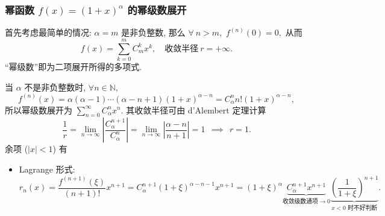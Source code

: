 \begin{frame}
\frametitle{幂函数 $f(x) = (1 + x)^{\alpha}$ 的幂级数展开}

{\color{red} } 首先考虑最简单的情况: $\alpha = m$ 是非负整数, 那么 $\forall ~ n > m,$ $f^{(n)}(0) = 0,$ 从而
\[
f(x) = \sum_{k=0}^m C_m^k x^k, \quad \text{收敛半径} ~ r = +\infty.
\]
``幂级数''即为二项展开所得的多项式.

\pause
\vspace{0.5em}

{\color{red} } 当 $\alpha$ 不是非负整数时, $\forall n \in \mathbb{N},$
\[
f^{(n)}(x) = \alpha (\alpha - 1) \cdots (\alpha - n + 1) (1 + x)^{\alpha - n} = C_\alpha^n n! (1 + x)^{\alpha - n},
\]
所以幂级数展开为 $\sum_{n=0}^\infty C_\alpha^n x^n.$ 其收敛半径可由 d'Alembert 定理计算
\[
\frac{1}{r} = \lim_{n \to \infty} \left| \frac{C_\alpha^{n+1}}{C_\alpha^n} \right| = \lim_{n \to \infty} \left| \frac{\alpha - n}{n + 1} \right| = 1 ~~ \implies ~~ r = 1.
\]
余项 ($|x| < 1$) 有
\begin{itemize}
\item Lagrange 形式:
\[
r_n(x) = \frac{f^{(n+1)}(\xi)}{(n+1)!} x^{n+1} = C_\alpha^{n+1} (1 + \xi)^{\alpha - n - 1} x^{n+1} = (1 + \xi)^{\alpha} \underbrace{C_\alpha^{n+1} x^{n+1}}_{\text{收敛级数通项} \to 0} \underbrace{\left( \frac{1}{1 + \xi} \right)^{n+1}}_{\text{$x < 0$ 时不好判断}}.
\]
\end{itemize}

\end{frame}


